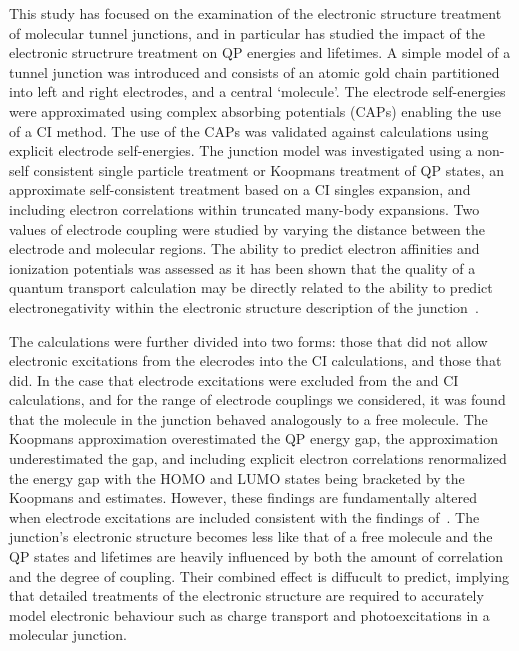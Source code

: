 This study has focused on the examination of the electronic structure
treatment of molecular tunnel junctions, and in particular has studied
the impact of the electronic structrure treatment on \ac{QP}
energies and lifetimes. A simple model of a tunnel junction was introduced
and consists of an atomic gold chain partitioned into left and right
electrodes, and a central `molecule'. The electrode self-energies were
approximated using complex absorbing potentials (\acp{CAP}) enabling the
use of a \ac{CI} method. The use of the \acp{CAP} was
validated against calculations using explicit electrode self-energies.
The junction model was investigated using a non-self consistent single
particle treatment or Koopmans treatment of \ac{QP} states, an
approximate self-consistent treatment based on a CI singles expansion,
and including electron correlations within truncated many-body expansions.
Two values of electrode coupling were studied by varying the distance
between the electrode and molecular regions. The ability to predict
electron affinities and ionization potentials was assessed as it has been
shown that the quality of a quantum transport calculation may be directly
related to the ability to predict electronegativity within the electronic
structure description of the junction~\cite{golden}. 

The calculations were further divided into two forms: those that did not
allow electronic excitations from the elecrodes into the CI calculations,
and those that did. In the case that electrode excitations were excluded
from the \dscf and CI calculations, and for the range of electrode
couplings we considered, it was found that the molecule in the junction
behaved analogously to a free molecule. The Koopmans approximation
overestimated the QP energy gap, the \dscf approximation underestimated
the gap, and including explicit electron correlations renormalized the
energy gap with the HOMO and LUMO states being bracketed by the Koopmans
and \dscf estimates. However, these findings are fundamentally
altered when electrode excitations are included consistent with the findings
of~\cite{galperin_nitzan2006leadexcitations}.
The junction's electronic structure becomes less like that of a free
molecule and the QP states and lifetimes are heavily influenced by both
the amount of correlation and the degree of coupling. Their combined
effect is diffucult to predict, implying that detailed treatments of the
electronic structure are required to accurately model electronic behaviour
such as charge transport and photoexcitations in a molecular junction.
